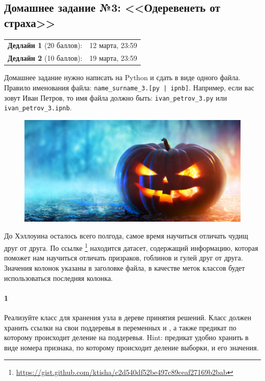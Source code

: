 \documentclass[a4paper,12pt]{article}
\begin{document}
\subsection*{Домашнее задание №3: <<Одеревенеть от страха>>}

\begin{tabular}{@{}lr}
  \textbf{Дедлайн 1} (20 баллов): & 12 марта, 23:59 \\
  \textbf{Дедлайн 2} (10 баллов): & 19 марта, 23:59
\end{tabular}

Домашнее задание нужно написать на Python и сдать в виде одного файла.
Правило именования файла: \texttt{name\_surname\_3.[py | ipnb]}. Например, если
вас зовут Иван Петров, то имя файла должно быть: \texttt{ivan\_petrov\_3.py} или \texttt{ivan\_petrov\_3.ipnb}.

\makebox[\linewidth]{\hrulefill}

\begin{figure}[h!]
  \centering
  \includegraphics[width=.8\linewidth]{images/boo}
\end{figure}

До Хэллоуина осталось всего полгода, самое время научиться отличать чудищ друг от друга. 
По ссылке \footnote{\url{https://gist.github.com/ktisha/c2d540df52be497c89ceaf27169b2bab}} находится датасет, содержащий информацию, которая поможет нам научиться отличать призраков, гоблинов и гулей друг от друга. Значения колонок указаны в заголовке файла, в качестве меток классов будет использоваться последняя колонка. 

\paragraph{1} Реализуйте класс  для хранения узла в дереве принятия решений. Класс должен хранить ссылки на свои поддеревья в переменных  и , а также предикат по которому происходит деление на поддеревья. Hint: предикат удобно хранить в виде номера признака, по которому происходит деление выборки, и его значения. 
\end{document}
